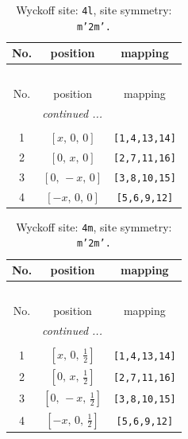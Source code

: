 \documentclass[fleqn,8pt]{jsarticle}
\begin{document}
\renewcommand{\arraystretch}{1.2}
\begin{longtable}{ccc}
\caption{Wyckoff site: {\tt 4l}, site symmetry: {\tt m'2m'.}}
 \\
 \hline \hline
No. & position & mapping \\ \hline \endfirsthead

\multicolumn{2}{l}{\tablename\ \thetable{}} \\
 \hline \hline
No. & position & mapping \\ \hline \endhead

 \hline \hline
\multicolumn{2}{r}{\footnotesize\it continued ...} \\ \endfoot

 \hline \hline
\multicolumn{2}{r}{} \\ \endlastfoot

1 & $\left[ x,\, 0,\, 0 \right]$ & {\tt [1,4,13,14]} \\ \hline
2 & $\left[ 0,\, x,\, 0 \right]$ & {\tt [2,7,11,16]} \\ \hline
3 & $\left[ 0,\, - x,\, 0 \right]$ & {\tt [3,8,10,15]} \\ \hline
4 & $\left[ - x,\, 0,\, 0 \right]$ & {\tt [5,6,9,12]} \\
\end{longtable}
\renewcommand{\arraystretch}{1.2}
\begin{longtable}{ccc}
\caption{Wyckoff site: {\tt 4m}, site symmetry: {\tt m'2m'.}}
 \\
 \hline \hline
No. & position & mapping \\ \hline \endfirsthead

\multicolumn{2}{l}{\tablename\ \thetable{}} \\
 \hline \hline
No. & position & mapping \\ \hline \endhead

 \hline \hline
\multicolumn{2}{r}{\footnotesize\it continued ...} \\ \endfoot

 \hline \hline
\multicolumn{2}{r}{} \\ \endlastfoot

1 & $\left[ x,\, 0,\, \frac{1}{2} \right]$ & {\tt [1,4,13,14]} \\ \hline
2 & $\left[ 0,\, x,\, \frac{1}{2} \right]$ & {\tt [2,7,11,16]} \\ \hline
3 & $\left[ 0,\, - x,\, \frac{1}{2} \right]$ & {\tt [3,8,10,15]} \\ \hline
4 & $\left[ - x,\, 0,\, \frac{1}{2} \right]$ & {\tt [5,6,9,12]} \\
\end{longtable}
\end{document}

